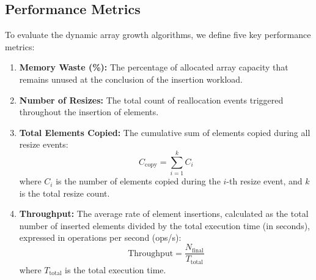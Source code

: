 \subsection{Performance Metrics}
To evaluate the dynamic array growth algorithms, we define five key performance metrics:
\begin{enumerate}
    \item \textbf{Memory Waste (\%):} The percentage of allocated array capacity that remains unused at the conclusion of the insertion workload.
    \item \textbf{Number of Resizes:} The total count of reallocation events triggered throughout the insertion of elements.
    \item \textbf{Total Elements Copied:} The cumulative sum of elements copied during all resize events:
    \begin{equation}
        C_{\text{copy}} = \sum_{i=1}^{k} C_i
    \end{equation}
    where $C_i$ is the number of elements copied during the $i$-th resize event, and $k$ is the total resize count.
    \item \textbf{Throughput:} The average rate of element insertions, calculated as the total number of inserted elements divided by the total execution time (in seconds), expressed in operations per second (ops/s):
    \begin{equation}
        \text{Throughput} = \frac{N_{\text{final}}}{T_{\text{total}}}
    \end{equation}
    where $T_{\text{total}}$ is the total execution time.
\end{enumerate}


